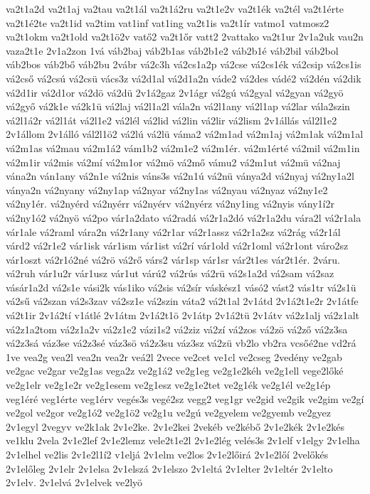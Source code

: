 {va2t1a2d
va2t1aj
va2tau
va2t1ál
va2t1á2ru
va2t1e2v
va2t1ék
va2tél
va2t1érte
va2t1é2te
va2t1id
va2tim
vat1inf
vat1ing
va2t1is
va2t1ír
vatmo1
vatmosz2
va2t1okm
va2t1old
va2t1ö2v
vatő2
va2t1őr
vatt2
2vattako
va2t1ur
2v1a2uk
vau2n
vaza2t1e
2v1a2zon
1vá
váb2baj
váb2b1as
váb2b1e2
váb2b1é
váb2bil
váb2bol
váb2bos
váb2bő
váb2bu
2vábr
vá2c3h
vá2cs1a2p
vá2cse
vá2cs1ék
vá2csip
vá2cs1is
vá2cső
vá2csú
vá2csü
vács3z
vá2d1al
vá2d1a2n
váde2
vá2des
vádé2
vá2dén
vá2dik
vá2d1ir
vá2d1or
vá2dö
vá2dü
2v1á2gaz
2v1ágr
vá2gú
vá2gyal
vá2gyan
vá2gyö
vá2győ
vá2k1e
vá2k1ü
vá2laj
vá2l1a2l
vála2n
vá2l1any
vá2l1ap
vá2lar
vála2szin
vá2l1á2r
vá2l1át
vá2l1e2
vá2lél
vá2lid
vá2lin
vá2lir
vá2lism
2v1állás
vál2l1e2
2v1állom
2v1álló
vál2l1ö2
vá2lú
vá2lü
váma2
vá2m1ad
vá2m1aj
vá2m1ak
vá2m1al
vá2m1as
vá2mau
vá2m1á2
vám1b2
vá2m1e2
vá2m1ér.
vá2m1érté
vá2mil
vá2m1in
vá2m1ir
vá2mis
vá2mí
vá2m1or
vá2mö
vá2mő
vámu2
vá2m1ut
vá2mü
vá2naj
vána2n
ván1any
vá2n1e
vá2nis
váns3s
vá2n1ú
vá2nü
ványa2d
vá2nyaj
vá2ny1a2l
ványa2n
vá2nyany
vá2ny1ap
vá2nyar
vá2ny1as
vá2nyau
vá2nyaz
vá2ny1e2
vá2ny1ér.
vá2nyérd
vá2nyérr
vá2nyérv
vá2nyérz
vá2ny1ing
vá2nyis
vány1í2r
vá2ny1ó2
vá2nyö
vá2po
vár1a2dato
vá2radá
vá2r1a2dó
vá2r1a2du
vára2l
vá2r1ala
vár1ale
vá2raml
vára2n
vá2r1any
vá2r1ar
vá2r1assz
vá2r1a2sz
vá2rág
vá2r1ál
várd2
vá2r1e2
vár1isk
vár1ism
vár1ist
vá2rí
vár1old
vá2r1oml
vá2r1ont
váro2sz
vár1oszt
vá2r1ó2né
vá2rö
vá2rő
várs2
vár1sp
vár1sr
vár2t1es
vár2t1ér.
2váru.
vá2ruh
vár1u2r
vár1usz
vár1ut
várú2
vá2rús
vá2rü
vá2s1a2d
vá2sam
vá2saz
vásár1a2d
vá2s1e
vási2k
vás1iko
vá2sis
vá2sír
váskész1
vásó2
vást2
vás1tr
vá2s1ü
vá2sű
vá2szan
vá2s3zav
vá2sz1e
vá2szin
váta2
vá2t1al
2v1átd
2v1á2t1e2r
2v1átfe
vá2t1ir
2v1á2tí
v1átlé
2v1átm
2v1á2t1ö
2v1átp
2v1á2tü
2v1átv
vá2z1alj
vá2z1alt
vá2z1a2tom
vá2z1a2v
vá2z1e2
vázi1s2
vá2ziz
vá2zí
vá2zos
vá2zö
vá2ző
vá2z3sa
vá2z3sá
váz3se
vá2z3sé
váz3sö
vá2z3su
váz3sz
vá2zü
vb2lo
vb2ra
vcsőé2ne
vd2rá
1ve
vea2g
vea2l
vea2n
vea2r
veá2l
2vece
ve2cet
ve1cl
ve2cseg
2vedény
ve2gab
ve2gac
ve2gar
ve2g1as
vega2z
ve2g1á2
ve2g1eg
ve2g1e2kéh
ve2g1ell
vege2lőké
ve2g1elr
ve2g1e2r
ve2g1esem
ve2g1esz
ve2g1e2tet
ve2g1ék
ve2g1él
ve2g1ép
veg1éré
veg1érte
veg1érv
vegés3s
vegé2sz
vegg2
veg1gr
ve2gid
ve2gik
ve2gim
ve2gí
ve2gol
ve2gor
ve2g1ó2
ve2g1ö2
ve2g1u
ve2gú
ve2gyelem
ve2gyemb
ve2gyez
2v1egyl
2vegyv
ve2k1ak
2v1e2ke.
2v1e2kei
2vekéb
ve2kébő
2v1e2kék
2v1e2kés
ve1klu
2vela
2v1e2lef
2v1e2lemz
vele2t1e2l
2v1e2lég
velés3s
2v1elf
v1elgy
2v1elha
2v1elhel
ve2lis
2v1e2l1í2
v1eljá
2v1elm
ve2los
2v1e2lőirá
2v1e2lőí
2velőkés
2v1előleg
2v1elr
2v1elsa
2v1elszá
2v1elszo
2v1eltá
2v1elter
2v1eltér
2v1elto
2v1elv.
2v1elvá
2v1elvek
ve2lyö
}
